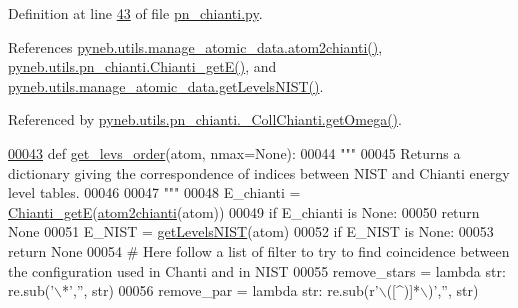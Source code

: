 Definition at line \hyperlink{pn__chianti_8py_source_l00043}{43} of file \hyperlink{pn__chianti_8py_source}{pn\+\_\+chianti.\+py}.



References \hyperlink{manage__atomic__data_8py_source_l00009}{pyneb.\+utils.\+manage\+\_\+atomic\+\_\+data.\+atom2chianti()}, \hyperlink{pn__chianti_8py_source_l00025}{pyneb.\+utils.\+pn\+\_\+chianti.\+Chianti\+\_\+get\+E()}, and \hyperlink{manage__atomic__data_8py_source_l00602}{pyneb.\+utils.\+manage\+\_\+atomic\+\_\+data.\+get\+Levels\+N\+I\+S\+T()}.



Referenced by \hyperlink{pn__chianti_8py_source_l00484}{pyneb.\+utils.\+pn\+\_\+chianti.\+\_\+\+Coll\+Chianti.\+get\+Omega()}.


\begin{DoxyCode}
\hypertarget{namespacepyneb_1_1utils_1_1pn__chianti_l00043}{}\hyperlink{namespacepyneb_1_1utils_1_1pn__chianti_aa5ac8c15155a7a63ddaefa054349ea16}{00043} \textcolor{keyword}{def }\hyperlink{namespacepyneb_1_1utils_1_1pn__chianti_aa5ac8c15155a7a63ddaefa054349ea16}{get\_levs\_order}(atom, nmax=None):
00044     \textcolor{stringliteral}{"""}
00045 \textcolor{stringliteral}{    Returns a dictionary giving the correspondence of indices between NIST and Chianti energy level tables.}
00046 \textcolor{stringliteral}{    }
00047 \textcolor{stringliteral}{    """}
00048     E\_chianti = \hyperlink{namespacepyneb_1_1utils_1_1pn__chianti_a9044db416b867ab604784eb0246c88e2}{Chianti\_getE}(\hyperlink{namespacepyneb_1_1utils_1_1manage__atomic__data_a9c992b2ae01f2e369be5d539172f78a0}{atom2chianti}(atom))
00049     \textcolor{keywordflow}{if} E\_chianti \textcolor{keywordflow}{is} \textcolor{keywordtype}{None}:
00050         \textcolor{keywordflow}{return} \textcolor{keywordtype}{None}
00051     E\_NIST = \hyperlink{namespacepyneb_1_1utils_1_1manage__atomic__data_ad09376e8676854d44680ae14210b5589}{getLevelsNIST}(atom)
00052     \textcolor{keywordflow}{if} E\_NIST \textcolor{keywordflow}{is} \textcolor{keywordtype}{None}:
00053         \textcolor{keywordflow}{return} \textcolor{keywordtype}{None}
00054     \textcolor{comment}{# Here follow a list of filter to try to find coincidence between the configuration used in Chanti and
       in NIST}
00055     remove\_stars = \textcolor{keyword}{lambda} str: re.sub(\textcolor{stringliteral}{'\(\backslash\)*'},\textcolor{stringliteral}{''}, str)
00056     remove\_par = \textcolor{keyword}{lambda} str: re.sub(\textcolor{stringliteral}{r'\(\backslash\)([^)]*\(\backslash\))'},\textcolor{stringliteral}{''}, str)

\end{DoxyCode}
